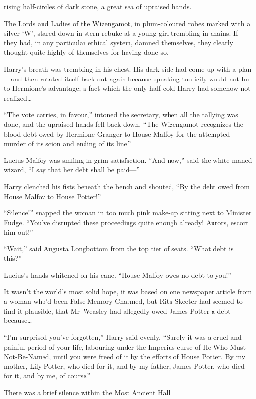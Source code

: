 
 rising half-circles of dark stone, a great sea of upraised hands.

\hplettrineextrapara
The Lords and Ladies of the Wizengamot, in plum-coloured robes marked with a silver ‘W’, stared down in stern rebuke at a young girl trembling in chains. If they had, in any particular ethical system, damned themselves, they clearly thought quite highly of themselves for having done so.

Harry’s breath was trembling in his chest. His dark side had come up with a plan—and then rotated itself back out again because speaking too icily would not be to Hermione’s advantage; a fact which the only-half-cold Harry had somehow not realized…

“The vote carries, in favour,” intoned the secretary, when all the tallying was done, and the upraised hands fell back down. “The Wizengamot recognizes the blood debt owed by Hermione Granger to House Malfoy for the attempted murder of its scion and ending of its line.”

Lucius Malfoy was smiling in grim satisfaction. “And now,” said the white-maned wizard, “I say that her debt shall be paid—”

Harry clenched his fists beneath the bench and shouted, “By the debt owed from House Malfoy to House Potter!”

“Silence!” snapped the woman in too much pink make-up sitting next to Minister Fudge. “You’ve disrupted these proceedings quite enough already! Aurors, escort him out!”

“Wait,” said Augusta Longbottom from the top tier of seats. “What debt is this?”

Lucius’s hands whitened on his cane. “House Malfoy owes no debt to you!”

It wasn’t the world’s most solid hope, it was based on one newspaper article from a woman who’d been False-Memory-Charmed, but Rita Skeeter had seemed to find it plausible, that Mr~Weasley had allegedly owed James Potter a debt because…

“I’m surprised you’ve forgotten,” Harry said evenly. “Surely it was a cruel and painful period of your life, labouring under the Imperius curse of He-Who-Must-Not-Be-Named, until you were freed of it by the efforts of House Potter. By my mother, Lily Potter, who died for it, and by my father, James Potter, who died for it, and by me, of course.”

There was a brief silence within the Most Ancient Hall.


